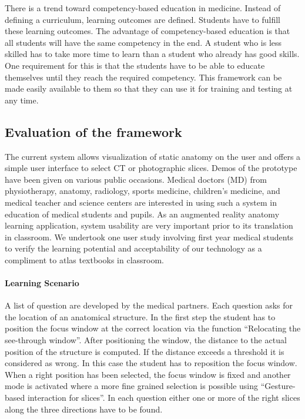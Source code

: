 {{{{{There is a trend toward competency-based education in medicine. Instead of defining a curriculum, learning outcomes are defined. Students have to fulfill these learning outcomes. The advantage of competency-based education is that all students will have the same competency in the end. A student who is less skilled has to take more time to learn than a student who already has good skills. One requirement for this is that the students have to be able to educate themselves until they reach the required competency. 
This framework can be made easily available to them so that they can use it for training and testing at any time.
	
\subsection{Evaluation of the framework}
The current system allows visualization of static anatomy on the user and offers a simple user interface to select CT or photographic slices. Demos of the prototype have been given on various public occasions. Medical doctors (MD) from physiotherapy, anatomy, radiology, sports medicine, children's medicine, and medical teacher and science centers are interested in using such a system in education of medical students and pupils. 
As an augmented reality anatomy learning application, system usability are very important prior to its translation in classroom. We undertook one user study involving first year medical students to verify the learning potential and acceptability of our technology as a compliment to atlas textbooks in classroom.

\paragraph{Learning Scenario} A list of question are developed by the medical partners. Each question asks for the location of an anatomical structure. 
In the first step the student has to position the focus window at the correct location via the function ``Relocating the see-through window''. After positioning the window, the distance to the actual position of the structure is computed. If the distance exceeds a threshold it is considered as wrong. In this case the student has to reposition the focus window. When a right position has been selected, the focus window is fixed and another mode is activated where a more fine grained selection is possible using ``Gesture-based interaction for slices''. 
In each question either one or more of the right slices along the three directions have to be found. 

}}}}}
